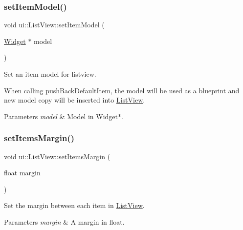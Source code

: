 \subsubsection{\texorpdfstring{set\+Item\+Model()}{setItemModel()}\hspace{0.1cm}{\footnotesize\ttfamily [2/2]}}
{\footnotesize\ttfamily void ui\+::\+List\+View\+::set\+Item\+Model (\begin{DoxyParamCaption}\item[{\hyperlink{classui_1_1Widget}{Widget} $\ast$}]{model }\end{DoxyParamCaption})}

Set an item model for listview.

When calling {\ttfamily push\+Back\+Default\+Item}, the model will be used as a blueprint and new model copy will be inserted into \hyperlink{classui_1_1ListView}{List\+View}. 
\begin{DoxyParams}{Parameters}
{\em model} & Model in {\ttfamily Widget$\ast$}. \\
\hline
\end{DoxyParams}
\mbox{\label{classui_1_1ListView_a945511bd4d4c08d528bd1cf50dbedb35}} 
\subsubsection{\texorpdfstring{set\+Items\+Margin()}{setItemsMargin()}\hspace{0.1cm}{\footnotesize\ttfamily [1/2]}}
{\footnotesize\ttfamily void ui\+::\+List\+View\+::set\+Items\+Margin (\begin{DoxyParamCaption}\item[{float}]{margin }\end{DoxyParamCaption})}

Set the margin between each item in \hyperlink{classui_1_1ListView}{List\+View}.


\begin{DoxyParams}{Parameters}
{\em margin} & A margin in float. \\
\hline
\end{DoxyParams}
\mbox{\label{classui_1_1ListView_a945511bd4d4c08d528bd1cf50dbedb35}} 
